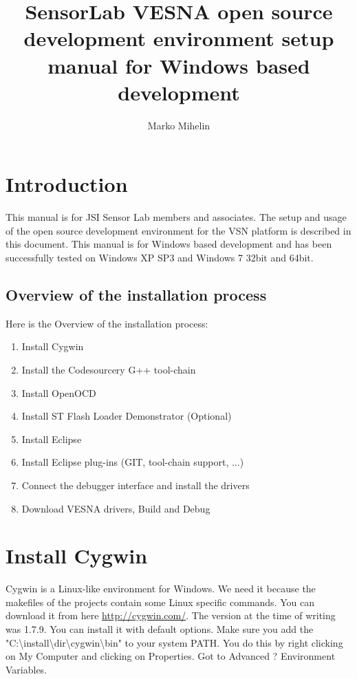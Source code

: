 \documentclass[12pt,a4paper]{article}
\author{Marko Mihelin}
\title{SensorLab VESNA open source development environment setup manual for Windows based development}
\begin{document}
\begin{titlepage}
\maketitle
\thispagestyle{empty}
\end{titlepage}

\tableofcontents
\newpage

\section{Introduction}
This manual is for JSI Sensor Lab members and associates. The setup and usage of the open source development environment for the VSN platform is described in this document.  This manual is for Windows based development and has been successfully tested on Windows XP SP3 and Windows 7 32bit and 64bit.

\subsection{Overview of the installation process}
Here is the Overview of the installation process:
\begin{enumerate}
\item Install Cygwin
\item Install the Codesourcery G++ tool-chain
\item Install OpenOCD
\item Install ST Flash Loader Demonstrator (Optional)
\item Install Eclipse
\item Install Eclipse plug-ins (GIT, tool-chain support, ...)
\item Connect the debugger interface and install the drivers
\item Download VESNA drivers, Build and Debug
\end{enumerate}

\section{Install Cygwin}
Cygwin is a  Linux-like environment for Windows. We need it because the makefiles of the projects contain some Linux specific commands. You can download it from here \href{http://cygwin.com/}{http://cygwin.com/}. The version at the time of writing was 1.7.9. You can install it with default options. Make sure you add the "C:\textbackslash install\textbackslash dir\textbackslash cygwin\textbackslash bin" to your system PATH. You do this by right clicking on My Computer and clicking on Properties. Got to Advanced ? Environment Variables.
\end{document}
